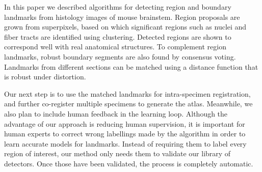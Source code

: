 \documentclass{llncs}
\begin{document}
In this paper we described algorithms for detecting region and boundary landmarks from histology images of mouse brainstem. Region proposals are grown from superpixels, based on which significant regions such as nuclei and fiber tracts are identified using clustering. Detected regions are shown to correspond well with real anatomical structures. To complement region landmarks, robust boundary segments are also found by consensus voting. Landmarks from different sections can be matched using a distance function that is robust under distortion.

Our next step is to use the matched landmarks for intra-specimen registration, and further co-register multiple specimens to generate the atlas. Meanwhile, we also plan to include human feedback in the learning loop. Although the advantage of our approach is reducing human supervision, it is important for human experts to correct wrong labellings made by the algorithm in order to learn accurate models for landmarks. Instead of requiring them to label every region of interest, our method only needs them to validate our library of detectors. Once those have been validated, the process is completely automatic.

%



%
%




%
%
\end{document}

